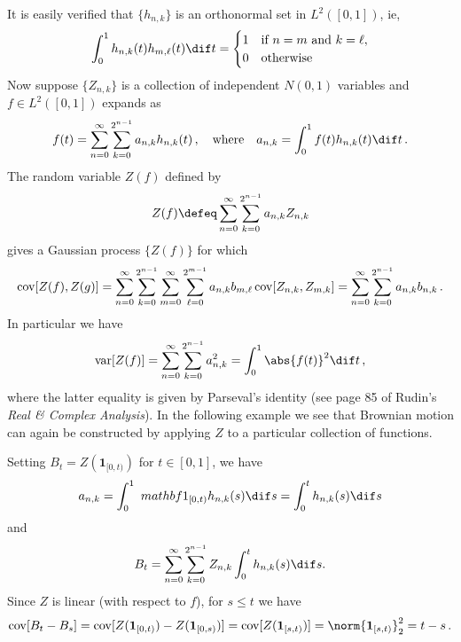 \documentclass[../../../Master/AppliedStochastics.tex]{subfiles}
\begin{document}
It is easily verified that $\{h_{n, k}\}$ is an orthonormal set in $L^2([0,1])$,
    ie,
\begin{equation*}
    \int_0^1 h_{n, k}(t) h_{m, \ell}(t) \dif t = 
    \begin{cases}
        1 & \text{if $n = m$ and $k = \ell$},\\
        0 & \text{otherwise}
    \end{cases}
\end{equation*}
Now suppose $\{Z_{n, k}\}$ is a collection of independent $N(0,1)$ variables
    and  $f \in L^2([0,1])$ expands as
\begin{equation*}
    f(t) = \sum_{n = 0}^\infty \sum_{k = 0}^{2^{n-1}} a_{n, k} h_{n, k}(t)
        \,,\quad\text{where}\quad a_{n, k} = \int_0^1 f(t) h_{n, k}(t) \dif t\,.
\end{equation*}
The random variable $Z(f)$ defined by 
\begin{equation*}
    Z(f) \defeq \sum_{n = 0}^\infty \sum_{k = 0}^{2^{n-1}} a_{n, k} Z_{n, k}
\end{equation*}
    gives a Gaussian process $\{Z(f)\}$ for which
\begin{equation*}
    \operatorname{cov}[Z(f), Z(g)]
        = \sum_{n = 0}^\infty \sum_{k = 0}^{2^{n-1}}
            \sum_{m = 0}^\infty \sum_{\ell = 0}^{2^{m-1}}
            a_{n, k} b_{m, \ell} \operatorname{cov}[Z_{n, k},Z_{m, k}]
        = \sum_{n = 0}^\infty \sum_{k = 0}^{2^{n-1}} a_{n, k}b_{n, k}\,.
\end{equation*}
In particular we have 
\begin{equation*}
    \var[Z(f)] = \sum_{n = 0}^\infty \sum_{k = 0}^{2^{n-1}} a_{n, k}^2
               = \int_0^1 \abs{f(t)}^2 \dif t\,,
\end{equation*}
    where the latter equality is given by Parseval's identity
    (see page 85 of Rudin's \emph{Real \& Complex Analysis}).
In the following example we see that Brownian motion can again
    be constructed by applying $Z$ to a particular collection of functions.
 
 
\begin{example}
    Setting $B_t = Z(\mathbf{1}_{[0,t)})$ for $t\in[0,1]$,
        we have
    \begin{equation*}
        a_{n, k} = \int_0^1\ mathbf{1}_{[0,t)} h_{n,k}(s) \dif s
                 = \int_0^t h_{n, k}(s) \dif s
     \end{equation*}
        and
    \begin{equation*}
        B_t = \sum_{n = 0}^\infty \sum_{k = 0}^{2^{n-1}} Z_{n, k}
            \int_0^t h_{n, k}(s) \dif s.
    \end{equation*}
    Since $Z$ is linear (with respect to $f$),
        for $s\leq t$ we have 
    \begin{equation*}
        \cov[B_t - B_s] = \cov[Z(\mathbf{1}_{[0,t)}) - Z(\mathbf{1}_{[0,s)})]
                        = \cov[Z(\mathbf{1}_{[s,t)})]
                        = \norm{\mathbf{1}_{[s,t)}}_2^2
                        = t - s\,.
    \end{equation*}
\end{example}
\end{document}
